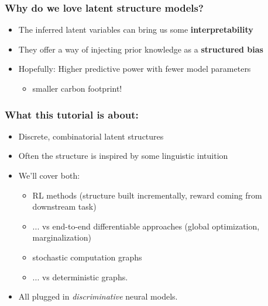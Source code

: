 \begin{frame}%
\frametitle{Why do we love latent structure models?}%

\begin{itemize}
\item The inferred latent variables can bring us some {\bf interpretability}
\item They offer a way of injecting prior knowledge as a {\bf structured bias}
\item Hopefully: Higher predictive power with fewer model parameters
\begin{itemize}
\item<2->{\alert{smaller carbon footprint!}}
\end{itemize}
\end{itemize}

\end{frame}


\begin{frame}
\frametitle{What this tutorial is about:}

\begin{itemize}
\item Discrete, combinatorial latent structures
\item Often the structure is inspired by some linguistic intuition
\item We'll cover both:
\begin{itemize}
\item RL methods (structure built incrementally, reward coming from downstream task)
\item ... vs end-to-end differentiable approaches (global optimization, marginalization)
\item stochastic computation graphs
\item ... vs deterministic graphs.
\end{itemize}
\item All plugged in \emph{discriminative} neural models.
\end{itemize}
\end{frame}


